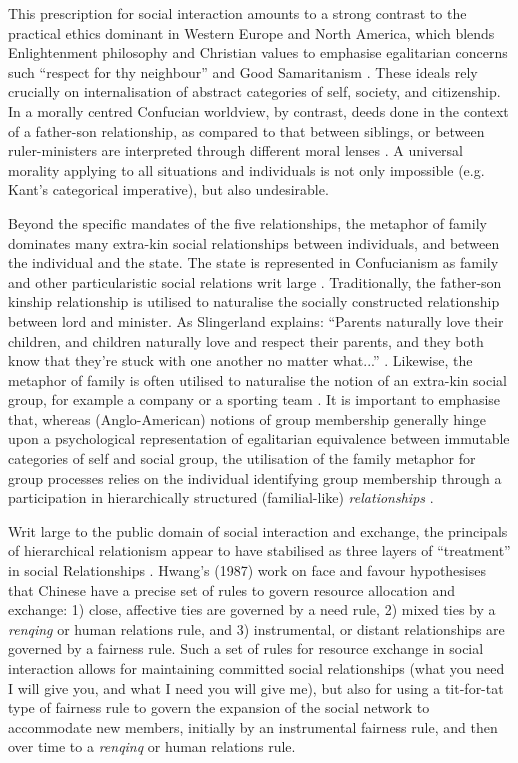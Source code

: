 \begin{CJK}{UTF8}{gbsn}
  This prescription for social interaction amounts to a strong contrast to the practical ethics dominant in Western Europe and North America, which blends Enlightenment philosophy and Christian values to emphasise egalitarian concerns such ``respect for thy neighbour'' and Good Samaritanism \citep{Liu2005}.  These ideals rely crucially on internalisation of abstract categories of self, society, and citizenship.  In a morally centred Confucian worldview, by contrast, deeds done in the context of a father-son relationship, as compared to that between siblings, or between ruler-ministers are interpreted through different moral lenses \citep{Liu2011}.  A universal morality applying to all situations and individuals is not only impossible (e.g. Kant’s categorical imperative), but also undesirable.

  Beyond the specific mandates of the five relationships, the metaphor of family dominates many extra-kin social relationships between individuals, and between the individual and the state. The state is represented in Confucianism as family and other particularistic social relations writ large \citep[579]{Liu2009}.  Traditionally, the father-son kinship relationship is utilised to naturalise the socially constructed relationship between lord and minister.  As Slingerland explains: ``Parents naturally love their children, and children naturally love and respect their parents, and they both know that they're stuck with one another no matter what...'' \citep[178]{Slingerland2014}. Likewise, the metaphor of family is often utilised to naturalise the notion of an extra-kin social group, for example a company or a sporting team \citep{Brownell2008}.
  It is important to emphasise that, whereas (Anglo-American) notions of group membership generally hinge upon a psychological representation of egalitarian equivalence between immutable categories of self and social group, the utilisation of the family metaphor for group processes relies on the individual identifying group membership through a participation in hierarchically structured (familial-like) \textit{relationships} \citep{Fei1992}.

  Writ large to the public domain of social interaction and exchange, the principals of hierarchical relationism appear to have stabilised as three layers of ``treatment'' in social Relationships \citep{Liu 2009}.  Hwang’s (1987) work on face and favour hypothesises that Chinese have a precise set of rules to govern resource allocation and exchange: 1) close, affective ties are governed by a need rule, 2) mixed ties by a \textit{renqing} or human relations rule, and 3) instrumental, or distant relationships are governed by a fairness rule.  Such a set of rules for resource exchange in social interaction allows for maintaining committed social relationships (what you need I will give you, and what I need you will give me), but also for using a tit-for-tat type of fairness rule to govern the expansion of the social network to accommodate new members, initially by an instrumental fairness rule, and then over time to a \textit{renqinq} or human relations rule.


\end{CJK}
